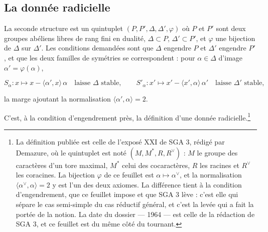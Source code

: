\documentclass[11pt,a4paper]{article}
\begin{document}
\subsection*{La donnée radicielle}

La seconde structure est un quintuplet $(P, P', \Delta, \Delta', \varphi)$ où
$P$ et $P'$ sont deux groupes abéliens libres de rang fini en dualité,
$\Delta\subset P$, $\Delta'\subset P'$, et $\varphi$ une bijection de $\Delta$
sur $\Delta'$. Les conditions demandées sont que $\Delta$ engendre $P$ et
$\Delta'$ engendre $P'$, et que les deux familles de symétries se
correspondent : pour $\alpha\in\Delta$ d'image $\alpha' = \varphi(\alpha)$,

\[
  S_{\alpha} : x \longmapsto x - \langle \alpha', x\rangle\,\alpha
  \quad\text{laisse } \Delta \text{ stable},
  \qquad
  S'_{\alpha} : x' \longmapsto x' - \langle x', \alpha\rangle\,\alpha'
  \quad\text{laisse } \Delta' \text{ stable},
\]

la marge ajoutant la normalisation $\langle \alpha', \alpha\rangle = 2$.

C'est, à la condition d'engendrement près, la définition d'une donnée
radicielle.\footnote{La définition publiée est celle de l'exposé XXI de SGA 3,
rédigé par Demazure, où le quintuplet est noté $(M, M^{*}, R, R^{\vee})$ : $M$
le groupe des caractères d'un tore maximal, $M^{*}$ celui des cocaractères,
$R$ les racines et $R^{\vee}$ les coracines. La bijection $\varphi$ de ce
feuillet est $\alpha\mapsto\alpha^{\vee}$, et la normalisation
$\langle\alpha^{\vee},\alpha\rangle = 2$ y est l'un des deux axiomes. La
différence tient à la condition d'engendrement, que ce feuillet impose et que
SGA 3 lève : c'est elle qui sépare le cas semi-simple du cas réductif général,
et c'est la levée qui a fait la portée de la notion. La date du dossier — 1964
— est celle de la rédaction de SGA 3, et ce feuillet est du même côté du
tournant.}
\end{document}
